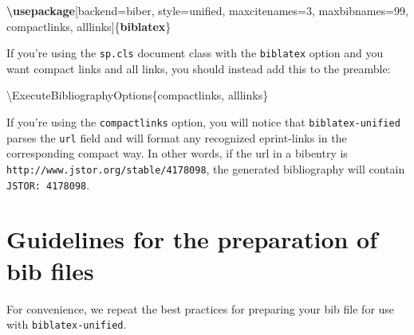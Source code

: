 \documentclass[
]{article}
\newenvironment{Shaded}{\begin{snugshade}}{\end{snugshade}}
\newcommand{\BuiltInTok}[1]{\textcolor[rgb]{0.39,0.29,0.61}{\textbf{#1}}}
\newcommand{\ExtensionTok}[1]{\textcolor[rgb]{0.00,0.58,1.00}{\textbf{#1}}}
\newcommand{\FunctionTok}[1]{\textcolor[rgb]{0.39,0.29,0.61}{#1}}
\newcommand{\NormalTok}[1]{\textcolor[rgb]{0.12,0.11,0.11}{#1}}
\begin{document}
\begin{Shaded}
\begin{Highlighting}[]
\BuiltInTok{\textbackslash{}usepackage}\NormalTok{[backend=biber,}
\NormalTok{            style=unified,}
\NormalTok{            maxcitenames=3,}
\NormalTok{            maxbibnames=99,}
\NormalTok{            compactlinks, alllinks]\{}\ExtensionTok{biblatex}\NormalTok{\}}
\end{Highlighting}
\end{Shaded}

If you're using the \texttt{sp.cls} document class with the
\texttt{biblatex} option and you want compact links and all links, you
should instead add this to the preamble:

\begin{Shaded}
\begin{Highlighting}[]
\FunctionTok{\textbackslash{}ExecuteBibliographyOptions}\NormalTok{\{compactlinks, alllinks\}}
\end{Highlighting}
\end{Shaded}

If you're using the \texttt{compactlinks} option, you will notice that
\texttt{biblatex-unified} parses the \texttt{url} field and will format
any recognized eprint-links in the corresponding compact way. In other
words, if the url in a bibentry is
\texttt{http://www.jstor.org/stable/4178098}, the generated bibliography
will contain \texttt{JSTOR:\ 4178098}.

\hypertarget{guidelines-for-the-preparation-of-bib-files}{%
\section{Guidelines for the preparation of bib
files}\label{guidelines-for-the-preparation-of-bib-files}}

For convenience, we repeat the best practices for preparing your bib
file for use with \texttt{biblatex-unified}.
\end{document}
